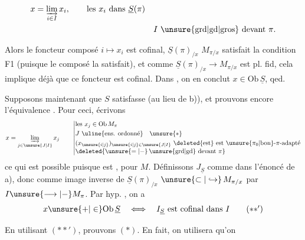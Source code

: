 
\[
\begin{aligned}
x&=\varinjlim_{i\in I}x_i,\qquad \text{les }x_i\text{ dans }\underline S(\pi)\\
&& I\ \unsure{\text{grd}|\text{gd}|\text{gros}}\text{ devant }\pi.
\end{aligned}
\]

Alors le foncteur composé $i\mapsto x_i$
est cofinal,   $\underline S(\pi)_{/x}$ \unsure{$-\!-$|$\longrightarrow$} $M_{\pi/x}$  satisfait la condition F1 (puisque le composé la satisfait), et comme $\underline S(\pi)_{/x}\longrightarrow M_{\pi/x}$ est pl. fid, cela implique déjà que ce foncteur est cofinal. Dans  , on en conclut $x\in\mathrm{Ob}\,\underline S$, qed.

Supposons maintenant que $S$ satisfasse  (au lieu de b)), et prouvons encore l'équivalence \unsure{$(*)$|$(**)$}. Pour ceci, écrivons
\[
 x=\varinjlim_{j\in\unsure{J|I}}x_j\qquad
 \left|\begin{aligned}
 &\text{les }x_j\in\mathrm{Ob}\,M_\pi\\
 &J\ \text{\uline{ens. ordonné}}\quad\unsure{*}\\
 &(x_{\unsure{i|j}})_{\unsure{i|j}\in\unsure{J|I}}\ \deleted{\text{est}}\ \text{est }\unsure{\pi_0|\text{bon}} \text{-}\pi\text{-adapté}\\[-2pt]
 &\deleted{\unsure{=|-}\,\unsure{\text{grd}|\text{gd}}\text{ devant }\pi}
 \end{aligned}\right.
\]
ce qui est possible puisque  est , pour $M$. \unsure{$]$} Définissons $J_{\underline S}$ comme dans l'énoncé de a), donc comme image inverse de $\underline S(\pi)_{/x}$ $\unsure{\subset|\hookrightarrow}\,M_{\pi/x}$ par $I\unsure{\longrightarrow|-}M_\pi$. Par hyp. , on a
\[
x\unsure{\mathord{+}|\in}\mathrm{Ob}\,\underline S\quad\Longleftrightarrow\quad I_{\underline S}\text{ est cofinal dans }I
\tag*{$(**')$}
\]

En utilisant $(**')$, prouvons  $(*)$.  En fait, on utilisera  qu'on


